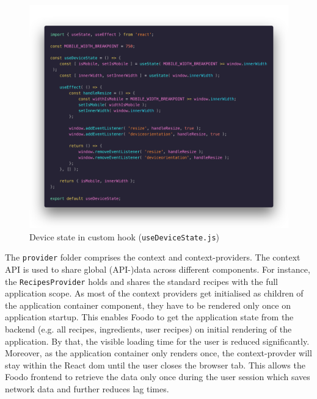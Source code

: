 \begin{figure}[!ht]
	\captionsetup{justification=centering}
	\centering
	\includegraphics[scale=0.28]{Ressourcen/img/code/hook.png}
	\vspace{-4em}
	\caption{Device state in custom hook (\texttt{useDeviceState.js})}
	\label{fig:button}
\end{figure}

The \texttt{provider} folder comprises the context and context-providers. The context API is used to share global (API-)data across different components. For instance, the \texttt{RecipesProvider} holds and shares the standard recipes with the full application scope. As most of the context providers get initialised as children of the application container component, they have to be rendered only once on application startup. This enables Foodo to get the application state from the backend (e.g. all recipes, ingredients, user recipes) on initial rendering of the application. By that, the visible loading time for the user is reduced significantly. Moreover, as the application container only renders once, the context-provder will stay within the React \gls{dom} until the user closes the browser tab. This allows the Foodo frontend to retrieve the data only once during the user session which saves network data and further reduces lag times.

